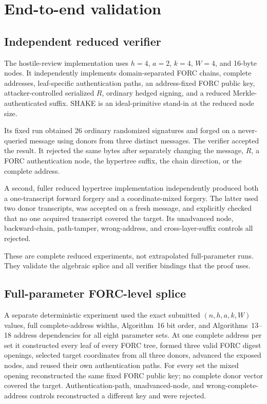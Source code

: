 \documentclass[11pt,a4paper]{article}
\begin{document}
\section{End-to-end validation}

\subsection{Independent reduced verifier}

The hostile-review implementation uses $h=4$, $a=2$, $k=4$, $W=4$, and
16-byte nodes.  It independently implements domain-separated FORC chains,
complete addresses, leaf-specific authentication paths, an address-fixed FORC
public key, attacker-controlled serialized $R$, ordinary hedged signing, and a
reduced Merkle-authenticated suffix.  SHAKE is an ideal-primitive stand-in at
the reduced node size.

Its fixed run obtained 26 ordinary randomized signatures and forged on a
never-queried message using donors from three distinct messages.  The verifier
accepted the result.  It rejected the same bytes after separately changing the
message, $R$, a FORC authentication node, the hypertree suffix, the chain
direction, or the complete address.

A second, fuller reduced hypertree implementation independently produced both
a one-transcript forward forgery and a coordinate-mixed forgery.  The latter
used two donor transcripts, was accepted on a fresh message, and explicitly
checked that no one acquired transcript covered the target.  Its unadvanced
node, backward-chain, path-tamper, wrong-address, and cross-layer-suffix
controls all rejected.

These are complete reduced experiments, not extrapolated full-parameter runs.
They validate the algebraic splice and all verifier bindings that the proof
uses.

\subsection{Full-parameter FORC-level splice}

A separate deterministic experiment used the exact submitted
$(n,h,a,k,W)$ values, full complete-address widths, Algorithm~16 bit order, and
Algorithms~13--18 address dependencies for all eight parameter sets.  At one
complete address per set it constructed every leaf of every FORC tree, formed
three valid FORC digest openings, selected target coordinates from all three
donors, advanced the exposed nodes, and reused their own authentication paths.
For every set the mixed opening reconstructed the same fixed FORC public key;
no complete donor vector covered the target.  Authentication-path,
unadvanced-node, and wrong-complete-address controls reconstructed a different
key and were rejected.
\end{document}
